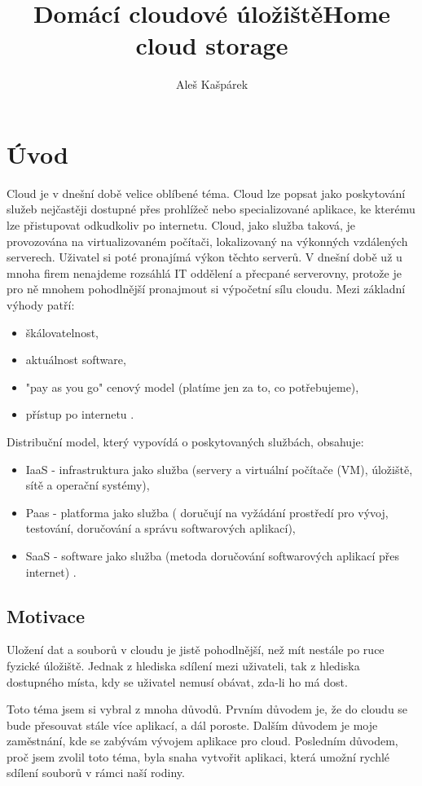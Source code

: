 \documentclass[
  glossaries,
]{kidiplom}
\title{Domácí cloudové úložiště}
\title[english]{Home cloud storage}
\author{Aleš Kašpárek}
\begin{document}
\maketitle

\section{Úvod}
\label{sec:intro}
Cloud je v dnešní době velice oblíbené téma. Cloud lze popsat jako poskytování služeb nejčastěji dostupné přes prohlížeč nebo specializované aplikace, ke kterému lze přistupovat odkudkoliv po internetu. Cloud, jako služba taková, je provozována na virtualizovaném počítači, lokalizovaný na výkonných vzdálených serverech. Uživatel si poté pronajímá výkon těchto serverů. V dnešní době už u mnoha firem nenajdeme rozsáhlá IT oddělení a přecpané serverovny, protože je pro ně mnohem pohodlnější pronajmout si výpočetní sílu cloudu. Mezi základní výhody patří:
\begin{itemize}
\item škálovatelnost,
\item aktuálnost software,
\item "pay as you go" cenový model (platíme jen za to, co potřebujeme),
\item přístup po internetu \cite{WIKI_CLOUD}.
\end{itemize}
Distribuční model, který vypovídá o poskytovaných službách, obsahuje:
\begin{itemize}
\item IaaS - infrastruktura jako služba (servery a virtuální počítače (VM), úložiště, sítě a operační systémy),
\item Paas - platforma jako služba ( doručují na vyžádání prostředí pro vývoj, testování, doručování a správu softwarových aplikací),
\item SaaS - software jako služba (metoda doručování softwarových aplikací přes internet) \cite{MS_CLOUD}.
\end{itemize}

\subsection{Motivace}
Uložení dat a souborů v cloudu je jistě pohodlnější, než mít nestále po ruce fyzické úložiště. Jednak z hlediska sdílení mezi uživateli, tak z hlediska dostupného místa, kdy se uživatel nemusí obávat, zda-li ho má dost. 

Toto téma jsem si vybral z mnoha důvodů. Prvním důvodem je, že do cloudu se bude přesouvat stále více aplikací, a dál poroste. Dalším důvodem je moje zaměstnání, kde se zabývám vývojem aplikace pro cloud. Posledním důvodem, proč jsem zvolil toto téma, byla snaha vytvořit aplikaci, která umožní rychlé sdílení souborů v rámci naší rodiny.
\end{document}
